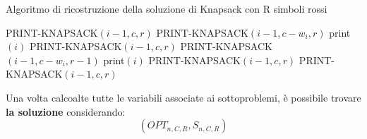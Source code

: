 \documentclass[12pt]{article}
\begin{document}
\begin{algorithm}[H]
    \caption{Algoritmo di ricostruzione della soluzione di Knapsack con R simboli rossi}
    \DontPrintSemicolon
     {
         {
             {
                PRINT-KNAPSACK$(i-1, c, r)$
            } {
                 {
                         {
                        PRINT-KNAPSACK$(i-1, c-w_i, r)$ \;
                        print$(i)$
                        } {
                        PRINT-KNAPSACK$(i-1, c, r)$
                        }
                } {
                     {
                         {
                        PRINT-KNAPSACK$(i-1, c-w_i, r-1)$ \;
                        print$(i)$
                        } {
                        PRINT-KNAPSACK$(i-1, c, r)$
                        }
                    } {
                        PRINT-KNAPSACK$(i-1, c, r)$
                    }
                }   
            }
        }
    }
\end{algorithm} \noindent
Una volta calcoalte tutte le variabili associate ai sottoproblemi, è possibile trovare \textbf{la soluzione} considerando:
$$(OPT_{n, C, R}, S_{n, C, R})$$
\end{document}
